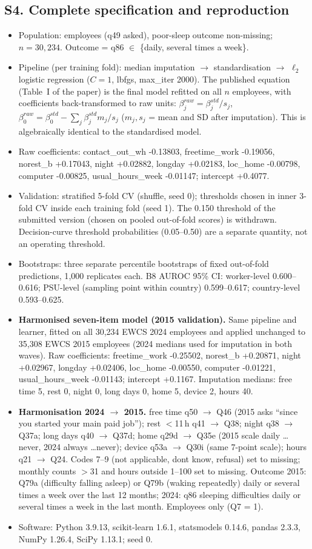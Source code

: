 \subsection*{S4. Complete specification and reproduction}
\begin{itemize}\setlength{\itemsep}{0pt}
\item Population: employees (q49 asked), poor-sleep outcome non-missing; $n=30{,}234$. Outcome = q86 $\in$ \{daily, several times a week\}.
\item Pipeline (per training fold): median imputation $\rightarrow$ standardisation $\rightarrow$ $\ell_2$ logistic regression ($C=1$, lbfgs, max\_iter 2000). The published equation (Table~I of the paper) is the final model refitted on all $n$ employees, with coefficients back-transformed to raw units: $\beta_j^{raw}=\beta_j^{std}/s_j$, $\beta_0^{raw}=\beta_0^{std}-\sum_j \beta_j^{std}m_j/s_j$ ($m_j, s_j$ = mean and SD after imputation). This is algebraically identical to the standardised model.
\item Raw coefficients: contact\_out\_wh -0.13803, freetime\_work -0.19056, norest\_b +0.17043, night +0.02882, longday +0.02183, loc\_home -0.00798, computer -0.00825, usual\_hours\_week -0.01147; intercept +0.4077.
\item Validation: stratified 5-fold CV (shuffle, seed 0); thresholds chosen in inner 3-fold CV inside each training fold (seed 1). The 0.150 threshold of the submitted version (chosen on pooled out-of-fold scores) is withdrawn. Decision-curve threshold probabilities (0.05--0.50) are a separate quantity, not an operating threshold.
\item Bootstraps: three separate percentile bootstraps of fixed out-of-fold predictions, 1{,}000 replicates each. B8 AUROC 95\% CI: worker-level 0.600--0.616; PSU-level (sampling point within country) 0.599--0.617; country-level 0.593--0.625.
\item \textbf{Harmonised seven-item model (2015 validation).} Same pipeline and learner, fitted on all 30{,}234 EWCS 2024 employees and applied unchanged to 35{,}308 EWCS 2015 employees (2024 medians used for imputation in both waves). Raw coefficients: freetime\_work -0.25502, norest\_b +0.20871, night +0.02967, longday +0.02406, loc\_home -0.00550, computer -0.01221, usual\_hours\_week -0.01143; intercept +0.1167. Imputation medians: free time 5, rest 0, night 0, long days 0, home 5, device 2, hours 40.
\item \textbf{Harmonisation 2024 $\rightarrow$ 2015.} free time q50 $\rightarrow$ Q46 (2015 asks ``since you started your main paid job''); rest $<$11\,h q41 $\rightarrow$ Q38; night q38 $\rightarrow$ Q37a; long days q40 $\rightarrow$ Q37d; home q29d $\rightarrow$ Q35e (2015 scale daily \ldots never, 2024 always \ldots never); device q53a $\rightarrow$ Q30i (same 7-point scale); hours q21 $\rightarrow$ Q24. Codes 7--9 (not applicable, don\textquotesingle t know, refusal) set to missing; monthly counts $>$31 and hours outside 1--100 set to missing. Outcome 2015: Q79a (difficulty falling asleep) or Q79b (waking repeatedly) daily or several times a week over the last 12 months; 2024: q86 sleeping difficulties daily or several times a week in the last month. Employees only (Q7 = 1).
\item Software: Python 3.9.13, scikit-learn 1.6.1, statsmodels 0.14.6, pandas 2.3.3, NumPy 1.26.4, SciPy 1.13.1; seed 0.
\end{itemize}
